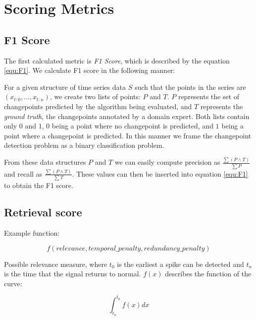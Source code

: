 \documentclass{uvamscse}	%
\begin{document}
\section{Scoring Metrics}

\subsection{F1 Score}

The first calculated metric is \emph{F1 Score}, which is described by the equation \ref{equ:F1}. We calculate F1 score in the following manner:

For a given structure of time series data $S$ such that the points in the series are $(x_{t:0},\ldots,x_{t:n})$, we create two lists of points: $P$ and $T$. $P$ represents the set of changepoints predicted by the algorithm being evaluated, and $T$ represents the \emph{ground truth}, the changepoints annotated by a domain expert. Both lists contain only $0$ and $1$, $0$ being a point where no changepoint is predicted, and $1$ being a point where a changepoint is predicted. In this manner we frame the changepoint detection problem as a binary classification problem.

From these data structures $P$ and $T$ we can easily compute precision as $\frac{\sum (P \wedge T) }{\sum P}$ and recall as $\frac{\sum (P \wedge T)}{\sum T}$. These values can then be inserted into equation \ref{equ:F1} to obtain the F1 score.

\subsection{Retrieval score}

Example function:

\begin{equation}
	f(relevance, temporal\_penalty, redundancy\_penalty)
\end{equation}


Possible relevance measure, where $t_0$ is the earliest a spike can be detected and $t_n$ is the time that the signal returns to normal. $f(x)$ describes the function of the curve:

\begin{equation}
	\int^{t_0}_{t_n} f(x) dx
\end{equation}
\end{document}
